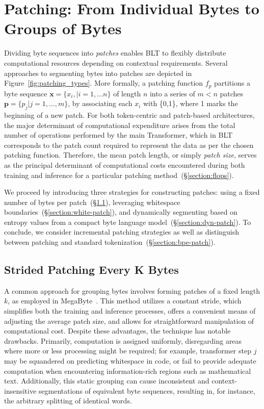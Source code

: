 \section{Patching: From Individual Bytes to Groups of Bytes}
\label{section:patching}

Dividing byte sequences into \textit{patches} enables {\textsc BLT} to flexibly distribute computational resources depending on contextual requirements. Several approaches to segmenting bytes into patches are depicted in Figure~\ref{fig:patching_types}. More formally, a patching function $f_p$ partitions a byte sequence $\pmb{x}=\{x_i,|i=1,\ldots n\}$ of length $n$ into a series of $m < n$ patches $\pmb{p}=\{p_j|j=1,\ldots,m\}$, by associating each $x_i$ with \{0,1\}, where 1 marks the beginning of a new patch. For both token-centric and patch-based architectures, the major determinant of computational expenditure arises from the total number of operations performed by the main Transformer, which in {\textsc BLT} corresponds to the patch count required to represent the data as per the chosen patching function. Therefore, the mean patch length, or simply \textit{patch size}, serves as the principal determinant of computational costs encountered during both training and inference for a particular patching method~(\S\ref{section:flops}).

We proceed by introducing three strategies for constructing patches: using a fixed number of bytes per patch~(\S\ref{section:static-patch}), leveraging whitespace boundaries~(\S\ref{section:white-patch}), and dynamically segmenting based on entropy values from a compact byte language model~(\S\ref{section:dyn-patch}). To conclude, we consider incremental patching strategies as well as distinguish between patching and standard tokenization~(\S\ref{section:bpe-patch}).

\subsection{Strided Patching Every K Bytes}
\label{section:static-patch}

A common approach for grouping bytes involves forming patches of a fixed length $k$, as employed in MegaByte~\citep{yu2023megabyte}. This method utilizes a constant stride, which simplifies both the training and inference processes, offers a convenient means of adjusting the average patch size, and allows for straightforward manipulation of computational cost. Despite these advantages, the technique has notable drawbacks. Primarily, computation is assigned uniformly, disregarding areas where more or less processing might be required; for example, transformer step $j$ may be squandered on predicting whitespace in code, or fail to provide adequate computation when encountering information-rich regions such as mathematical text. Additionally, this static grouping can cause inconsistent and context-insensitive segmentations of equivalent byte sequences, resulting in, for instance, the arbitrary splitting of identical words.

